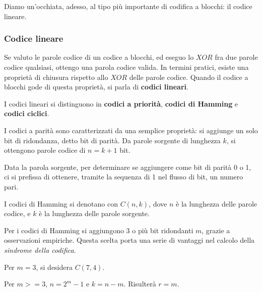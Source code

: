        \vspace{3mm}
        
        Diamo un'occhiata, adesso, al tipo più importante di codifica a blocchi: il codice lineare.
        
        \subsubsection{Codice lineare}
        
            Se valuto le parole codice di un codice a blocchi, ed eseguo lo $XOR$ fra due parole codice qualsiasi, ottengo una parola codice valida. In termini pratici, esiste una proprietà di chiusura rispetto allo $XOR$ delle parole codice. Quando il codice a blocchi gode di questa proprietà, si parla di \textbf{codici lineari}.
            
            I codici lineari si distinguono in \textbf{codici a priorità}, \textbf{codici di Hamming} e \textbf{codici ciclici}.
            
            
                I codici a parità sono caratterizzati da una semplice proprietà: si aggiunge un solo bit di ridondanza, detto bit di parità. Da parole sorgente di lunghezza $k$, si ottengono parole codice di $n=k+1$ bit.
                
                Data la parola sorgente, per determinare se aggiungere come bit di parità 0 o 1, ci si prefissa di ottenere, tramite la sequenza di 1 nel flusso di bit, un numero pari.
                
            
                I codici di Hamming si denotano con $C(n, k)$, dove $n$ è la lunghezza delle parole codice, e $k$ è la lunghezza delle parole sorgente.
                
                Per i codici di Hamming si aggiungono 3 o più bit ridondanti $m$, grazie a osservazioni empiriche. Questa scelta porta una serie di vantaggi nel calcolo della \textit{sindrome della codifica}.
                
                \vspace{3mm}
                
                Per $m=3$, si desidera $C(7,4)$.
                
                Per $m>=3$, $n=2^m - 1$ e $k=n-m$. Risulterà $r=m$.
                
